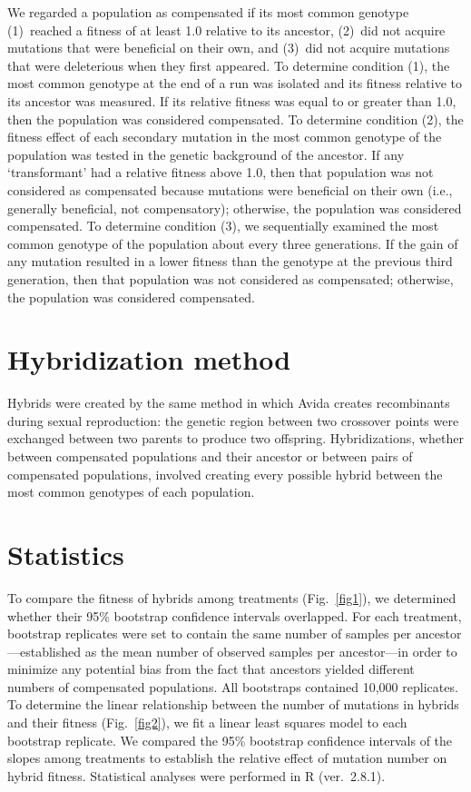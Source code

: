 \documentclass[11pt]{article}
\begin{document}
We regarded a population as compensated if its most common genotype
(1)~reached a fitness of at least 1.0 relative to its ancestor,
(2)~did not acquire mutations that were beneficial on their own, and
(3)~did not acquire mutations that were deleterious when they first appeared.
%
To determine condition (1), the most common genotype at the end of a run
was isolated and its fitness relative to its ancestor was measured.
%
If its relative fitness was equal to or greater than 1.0,
then the population was considered compensated.
%
To determine condition (2), the fitness effect of each
secondary mutation in the most common genotype of the population
was tested in the genetic background of the ancestor.
%
If any `transformant' had a relative fitness above 1.0,
then that population was not considered as compensated
because mutations were beneficial on their own
(i.e., generally beneficial, not compensatory);
otherwise, the population was considered compensated.
%
To determine condition (3), we sequentially examined the
most common genotype of the population about every three generations.
%
If the gain of any mutation resulted in a lower fitness than the
genotype at the previous third generation,
then that population was not considered as compensated;
otherwise, the population was considered compensated.



\section*{Hybridization method}

Hybrids were created by the same method in which Avida
creates recombinants during sexual reproduction:
the genetic region between two crossover points
were exchanged between two parents to produce two offspring.
%
Hybridizations, whether between compensated populations
and their ancestor or between pairs of compensated populations,
involved creating every possible hybrid
between the most common genotypes of each population.



\section*{Statistics}

To compare the fitness of hybrids among treatments (Fig.~\ref{fig1}),
we determined whether their 95\% bootstrap confidence intervals overlapped.
%
For each treatment, bootstrap replicates were set to contain the
same number of samples per ancestor---established as the mean number
of observed samples per ancestor---in order to minimize any
potential bias from the fact that ancestors yielded different
numbers of compensated populations.
%
All bootstraps contained 10,000 replicates.
%
To determine the linear relationship between the number of mutations
in hybrids and their fitness (Fig.~\ref{fig2}),
we fit a linear least squares model to each bootstrap replicate.
%
We compared the 95\% bootstrap confidence intervals of the slopes
among treatments to establish the relative effect of mutation number
on hybrid fitness.
%
Statistical analyses were performed in R (ver.~2.8.1).
\end{document}
